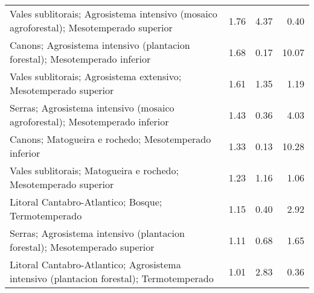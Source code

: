 \begin{table}[p]
\begin{tabular}{lrrr}
  Vales sublitorais; Agrosistema intensivo (mosaico agroforestal); Mesotemperado superior & 1.76 & 4.37 & 0.40 \\ 
  Canons; Agrosistema intensivo (plantacion forestal); Mesotemperado inferior & 1.68 & 0.17 & 10.07 \\ 
  Vales sublitorais; Agrosistema extensivo; Mesotemperado superior & 1.61 & 1.35 & 1.19 \\ 
  Serras; Agrosistema intensivo (mosaico agroforestal); Mesotemperado inferior & 1.43 & 0.36 & 4.03 \\ 
  Canons; Matogueira e rochedo; Mesotemperado inferior & 1.33 & 0.13 & 10.28 \\ 
  Vales sublitorais; Matogueira e rochedo; Mesotemperado superior & 1.23 & 1.16 & 1.06 \\ 
  Litoral Cantabro-Atlantico; Bosque; Termotemperado & 1.15 & 0.40 & 2.92 \\ 
  Serras; Agrosistema intensivo (plantacion forestal); Mesotemperado superior & 1.11 & 0.68 & 1.65 \\ 
  Litoral Cantabro-Atlantico; Agrosistema intensivo (plantacion forestal); Termotemperado & 1.01 & 2.83 & 0.36 \\ 
   \hline
\end{tabular}
\end{table}
